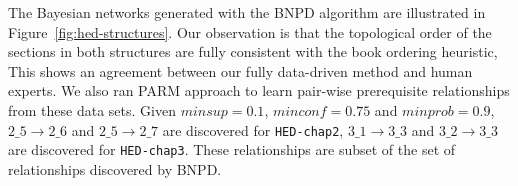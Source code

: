 \documentclass{edm_template}
\newcommand{\hl}[1]{\colorbox{yellow}{#1}}
\begin{document}
{	The Bayesian networks generated with the BNPD algorithm are illustrated in Figure~\ref{fig:hed-structures}.
	Our observation is that the topological order of the sections in both structures are fully consistent with the book ordering heuristic,
	This shows an agreement between our fully data-driven method and human experts.
	We also ran PARM approach to learn pair-wise prerequisite relationships from these data sets. Given $minsup=0.1$, $minconf=0.75$ and $minprob=0.9$,
	$2\_5\rightarrow 2\_6$ and $2\_5\rightarrow 2\_7$ are discovered for \texttt{HED-chap2},
	$3\_1\rightarrow 3\_3$ and $3\_2\rightarrow 3\_3$ are discovered for \texttt{HED-chap3}.
	These relationships are subset of the set of relationships discovered by BNPD. 

	
}
\end{document}
